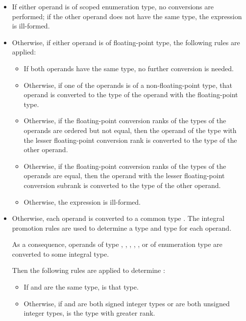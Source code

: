 \begin{itemize}
\item If either operand is of scoped enumeration type, no conversions
are performed; if the other operand does not have the same type, the expression is
ill-formed.
\item Otherwise, if either operand is of floating-point type,
the following rules are applied:
\begin{itemize}
\item
If both operands have the same type, no further conversion is needed.
\item
Otherwise, if one of the operands is of a non-floating-point type,
that operand is converted to the type of
the operand with the floating-point type.
\item
Otherwise, if the floating-point conversion ranks of
the types of the operands are ordered but not equal,
then the operand of the type with the lesser floating-point conversion rank
is converted to the type of the other operand.
\item
Otherwise, if the floating-point conversion ranks of the types of
the operands are equal,
then the operand with the lesser floating-point conversion subrank
is converted to the type of the other operand.
\item
Otherwise, the expression is ill-formed.
\end{itemize}
\item Otherwise, each operand is converted to a common type .
The integral promotion rules are used
to determine a type  and type  for each operand.
\begin{footnote}
As a consequence, operands of type , , ,
, , or of enumeration type are converted
to some integral type.
\end{footnote}
Then the following rules are applied to determine :

\begin{itemize}

\item If  and  are the same type,  is that type.

\item Otherwise, if  and  are both signed integer types or
are both unsigned integer types,
 is the type with greater rank.


\end{itemize}
\end{itemize}
